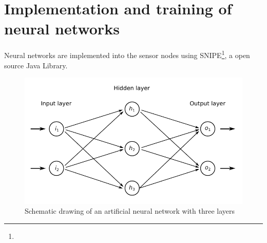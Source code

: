 \documentclass[12pt,a4paper]{scrartcl}
\begin{document}
\newpage


\section*{Implementation and training of neural networks}

Neural networks are implemented into the sensor nodes using SNIPE\footnote{}, a open source Java Library.
\begin{figure}[ht]
    \centering
    \includegraphics{figures/neuralnetwork.pdf}
    \caption{Schematic drawing of an artificial neural network with three layers}
    \label{fig:neuralnetwork}
\end{figure}



%
%
%
%
\end{document}
